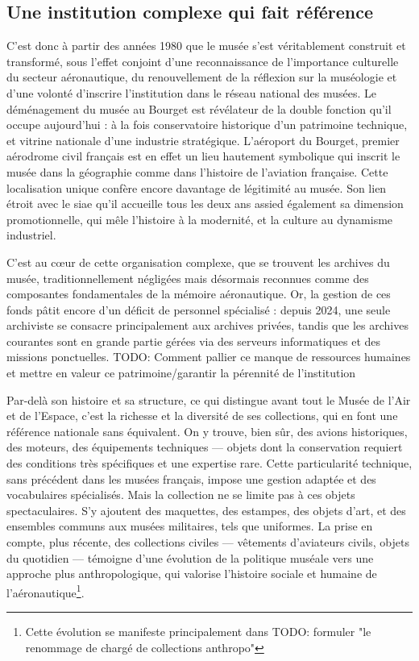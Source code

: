 \subsection{Une institution complexe qui fait référence}
C’est donc à partir des années 1980 que le musée s’est véritablement construit et transformé, sous l’effet conjoint d’une reconnaissance de l’importance culturelle du secteur aéronautique, du renouvellement de la réflexion sur la muséologie et d’une volonté d'inscrire l'institution dans le réseau national des musées. Le déménagement du musée au Bourget est révélateur de la double fonction qu’il occupe aujourd’hui : à la fois conservatoire historique d’un patrimoine technique, et vitrine nationale d’une industrie stratégique. L’aéroport du Bourget, premier aérodrome civil français est en effet un lieu hautement symbolique qui inscrit le musée dans la géographie comme dans l'histoire de l'aviation française. Cette localisation unique confère encore davantage de légitimité au musée. Son lien étroit avec le \ac{siae} qu'il accueille tous les deux ans assied également sa dimension promotionnelle, qui mêle l’histoire à la modernité, et la culture au dynamisme industriel.



C'est au cœur de cette organisation complexe, que se trouvent les archives du musée, traditionnellement négligées mais désormais reconnues comme des composantes fondamentales de la mémoire aéronautique. Or, la gestion de ces fonds pâtit encore d’un déficit de personnel spécialisé : depuis 2024, une seule archiviste se consacre principalement aux archives privées, tandis que les archives courantes sont en grande partie gérées via des serveurs informatiques et des missions ponctuelles. TODO: Comment pallier ce manque de ressources humaines et mettre en valeur ce patrimoine/garantir la pérennité de l'institution

Par-delà son histoire et sa structure, ce qui distingue avant tout le Musée de l’Air et de l’Espace, c’est la richesse et la diversité de ses collections, qui en font une référence nationale sans équivalent. On y trouve, bien sûr, des avions historiques, des moteurs, des équipements techniques — objets dont la conservation requiert des conditions très spécifiques et une expertise rare. Cette particularité technique, sans précédent dans les musées français, impose une gestion adaptée et des vocabulaires spécialisés. Mais la collection ne se limite pas à ces objets spectaculaires. S’y ajoutent des maquettes, des estampes, des objets d’art, et des ensembles communs aux musées militaires, tels que uniformes. La prise en compte, plus récente, des collections civiles — vêtements d’aviateurs civils, objets du quotidien — témoigne d’une évolution de la politique muséale vers une approche plus anthropologique, qui valorise l’histoire sociale et humaine de l’aéronautique\footnote{Cette évolution se manifeste principalement dans TODO: formuler "le renommage de chargé de collections anthropo"}.

